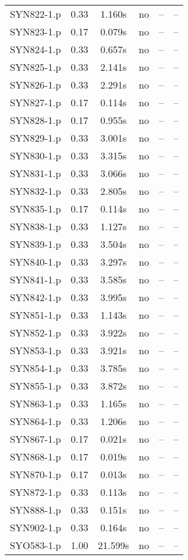 \begin{center}
\begin{longtable}{||c | c | c | c | c | c||}
SYN822-1.p & 0.33 & 1.160s & no & -- & -- \\
SYN823-1.p & 0.17 & 0.079s & no & -- & -- \\
SYN824-1.p & 0.33 & 0.657s & no & -- & -- \\
SYN825-1.p & 0.33 & 2.141s & no & -- & -- \\
SYN826-1.p & 0.33 & 2.291s & no & -- & -- \\
SYN827-1.p & 0.17 & 0.114s & no & -- & -- \\
SYN828-1.p & 0.17 & 0.955s & no & -- & -- \\
SYN829-1.p & 0.33 & 3.001s & no & -- & -- \\
SYN830-1.p & 0.33 & 3.315s & no & -- & -- \\
SYN831-1.p & 0.33 & 3.066s & no & -- & -- \\
SYN832-1.p & 0.33 & 2.805s & no & -- & -- \\
SYN835-1.p & 0.17 & 0.114s & no & -- & -- \\
SYN838-1.p & 0.33 & 1.127s & no & -- & -- \\
SYN839-1.p & 0.33 & 3.504s & no & -- & -- \\
SYN840-1.p & 0.33 & 3.297s & no & -- & -- \\
SYN841-1.p & 0.33 & 3.585s & no & -- & -- \\
SYN842-1.p & 0.33 & 3.995s & no & -- & -- \\
SYN851-1.p & 0.33 & 1.143s & no & -- & -- \\
SYN852-1.p & 0.33 & 3.922s & no & -- & -- \\
SYN853-1.p & 0.33 & 3.921s & no & -- & -- \\
SYN854-1.p & 0.33 & 3.785s & no & -- & -- \\
SYN855-1.p & 0.33 & 3.872s & no & -- & -- \\
SYN863-1.p & 0.33 & 1.165s & no & -- & -- \\
SYN864-1.p & 0.33 & 1.206s & no & -- & -- \\
SYN867-1.p & 0.17 & 0.021s & no & -- & -- \\
SYN868-1.p & 0.17 & 0.019s & no & -- & -- \\
SYN870-1.p & 0.17 & 0.013s & no & -- & -- \\
SYN872-1.p & 0.33 & 0.113s & no & -- & -- \\
SYN888-1.p & 0.33 & 0.151s & no & -- & -- \\
SYN902-1.p & 0.33 & 0.164s & no & -- & -- \\
SYO583-1.p & 1.00 & 21.599s & no & -- & -- \\

\end{longtable}
\end{center}
